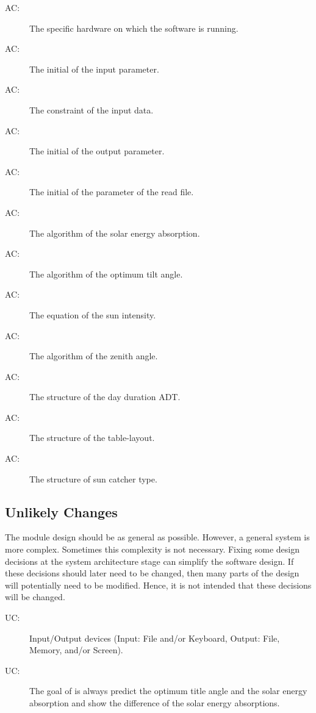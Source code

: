 \documentclass[12pt, titlepage]{article}
\newcounter{acnum}
\newcommand{\actheacnum}{AC\theacnum}
\newcounter{ucnum}
\newcommand{\uctheucnum}{UC\theucnum}
\begin{document}
\begin{description}
\item[ \actheacnum \label{acH}:] The specific
  hardware on which the software is running.
\item[ \actheacnum \label{acIP}:] The initial of the
  input parameter. 
\item[ \actheacnum \label{acIC}:] The constraint of the input data.
\item[ \actheacnum \label{acO}:] The initial of the
  output parameter. 
\item[ \actheacnum \label{acR}:] The initial of the
  parameter of the read file.
\item[ \actheacnum \label{acSEA}:] The algorithm of the
 solar energy absorption.
\item[ \actheacnum \label{acOTP}:] The algorithm of the 
optimum tilt angle.
\item[ \actheacnum \label{acSI}:] The equation of the sun
intensity.
\item[ \actheacnum \label{acZA}:] The algorithm of the
 zenith angle.
\item[ \actheacnum \label{acDD}:] The structure of the 
day duration ADT.
\item[ \actheacnum \label{acT}:] The structure of 
the table-layout.
\item[ \actheacnum \label{acSCT}:]  The structure of 
sun catcher type.
\end{description}

\subsection{Unlikely Changes} \label{SecUchange}

The module design should be as general as possible. However, a general system
is more complex. Sometimes this complexity is not necessary. Fixing some design
decisions at the system architecture stage can simplify the software design. If
these decisions should later need to be changed, then many parts of the design
will potentially need to be modified. Hence, it is not intended that these
decisions will be changed.

\begin{description}
\item[ \uctheucnum \label{ucIO}:] Input/Output devices
  (Input: File and/or Keyboard, Output: File, Memory, and/or Screen).
\item[ \uctheucnum \label{ucIO}:] The goal of \progname
is always predict the optimum title angle and the solar energy absorption and show the difference of the solar energy absorptions.
\end{description}
\end{document}
